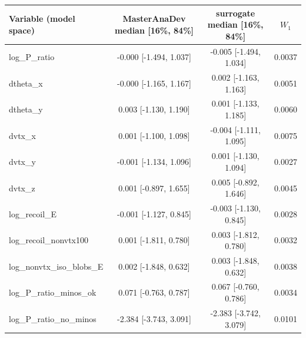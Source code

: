 \begin{tabular}{lccc}
\toprule
Variable (model space) & MasterAnaDev median [16\%, 84\%] & surrogate median [16\%, 84\%] & $W_1$ \\
\midrule
log\_P\_ratio & -0.000 [-1.494, 1.037] & -0.005 [-1.494, 1.034] & 0.0037 \\
dtheta\_x & -0.000 [-1.165, 1.167] & 0.002 [-1.163, 1.163] & 0.0051 \\
dtheta\_y & 0.003 [-1.130, 1.190] & 0.001 [-1.133, 1.185] & 0.0060 \\
dvtx\_x & 0.001 [-1.100, 1.098] & -0.004 [-1.111, 1.095] & 0.0075 \\
dvtx\_y & -0.001 [-1.134, 1.096] & 0.001 [-1.130, 1.094] & 0.0027 \\
dvtx\_z & 0.001 [-0.897, 1.655] & 0.005 [-0.892, 1.646] & 0.0045 \\
log\_recoil\_E & -0.001 [-1.127, 0.845] & -0.003 [-1.130, 0.845] & 0.0028 \\
log\_recoil\_nonvtx100 & 0.001 [-1.811, 0.780] & 0.003 [-1.812, 0.780] & 0.0032 \\
log\_nonvtx\_iso\_blobs\_E & 0.002 [-1.848, 0.632] & 0.003 [-1.848, 0.632] & 0.0038 \\
log\_P\_ratio\_minos\_ok & 0.071 [-0.763, 0.787] & 0.067 [-0.760, 0.786] & 0.0034 \\
log\_P\_ratio\_no\_minos & -2.384 [-3.743, 3.091] & -2.383 [-3.742, 3.079] & 0.0101 \\
\bottomrule
\end{tabular}
